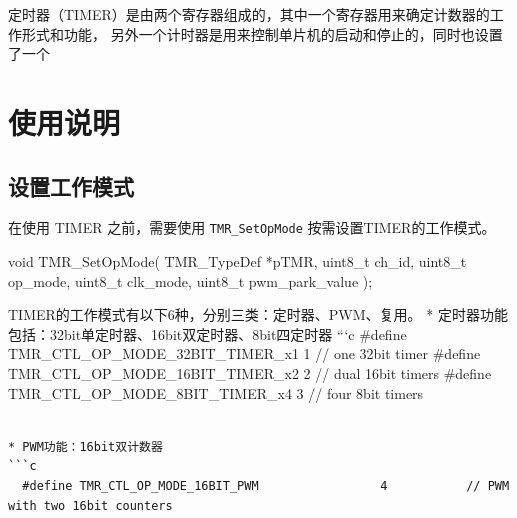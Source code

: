 \documentclass[
  12pt,
]{book}
\newenvironment{Shaded}{\begin{snugshade}}{\end{snugshade}}
\newcommand{\DataTypeTok}[1]{\textcolor[rgb]{0.13,0.29,0.53}{#1}}
\newcommand{\NormalTok}[1]{#1}
\begin{document}
定时器（TIMER）是由两个寄存器组成的，其中一个寄存器用来确定计数器的工作形式和功能，
另外一个计时器是用来控制单片机的启动和停止的，同时也设置了一个

\hypertarget{ux4f7fux7528ux8bf4ux660e-6}{%
\section{使用说明}\label{ux4f7fux7528ux8bf4ux660e-6}}

\hypertarget{ux8bbeux7f6eux5de5ux4f5cux6a21ux5f0f}{%
\subsection{设置工作模式}\label{ux8bbeux7f6eux5de5ux4f5cux6a21ux5f0f}}

在使用 TIMER 之前，需要使用 \texttt{TMR\_SetOpMode} 按需设置TIMER的工作模式。

\begin{Shaded}
\begin{Highlighting}[]
\DataTypeTok{void}\NormalTok{ TMR_SetOpMode(}
\NormalTok{  TMR_TypeDef *pTMR, }
  \DataTypeTok{uint8_t}\NormalTok{ ch_id, }
  \DataTypeTok{uint8_t}\NormalTok{ op_mode, }
  \DataTypeTok{uint8_t}\NormalTok{ clk_mode, }
  \DataTypeTok{uint8_t}\NormalTok{ pwm_park_value}
\NormalTok{  );}
\end{Highlighting}
\end{Shaded}

TIMER的工作模式有以下6种，分别三类：定时器、PWM、复用。
* 定时器功能包括：32bit单定时器、16bit双定时器、8bit四定时器
```c
\#define TMR\_CTL\_OP\_MODE\_32BIT\_TIMER\_x1 1 // one 32bit timer
\#define TMR\_CTL\_OP\_MODE\_16BIT\_TIMER\_x2 2 // dual 16bit timers
\#define TMR\_CTL\_OP\_MODE\_8BIT\_TIMER\_x4 3 // four 8bit timers

\begin{verbatim}

* PWM功能：16bit双计数器
```c
  #define TMR_CTL_OP_MODE_16BIT_PWM                 4           // PWM with two 16bit counters
\end{verbatim}
\end{document}
